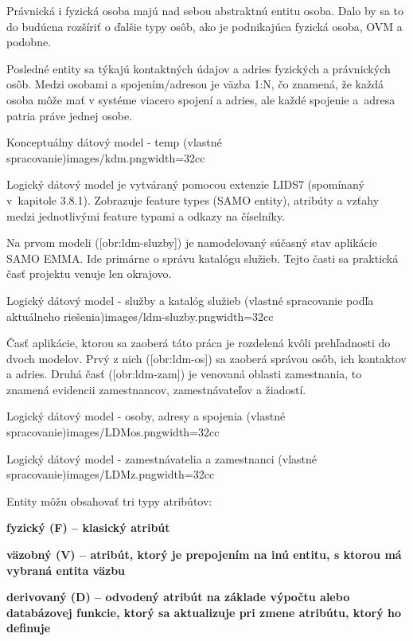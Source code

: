 Právnická i fyzická osoba majú nad sebou abstraktnú entitu osoba. Dalo by sa to do budúcna rozšíriť o ďalšie typy osôb, ako je podnikajúca fyzická osoba, OVM a podobne. 

Posledné entity sa týkajú kontaktných údajov a adries fyzických a právnických osôb. Medzi osobami a spojením/adresou je väzba 1:N, čo znamená, že každá osoba môže mať v systéme viacero spojení a adries, ale každé spojenie a~adresa patria práve jednej osobe.


{Konceptuálny dátový model - temp (vlastné spracovanie)}{images/kdm.png}{width=32cc}

\zlom
{}
Logický dátový model je vytváraný pomocou extenzie LIDS7 (spomínaný v~kapitole 3.8.1). Zobrazuje feature types (SAMO entity), atribúty a vzťahy medzi jednotlivými feature typami a odkazy na číselníky.

Na prvom modeli ([obr:ldm-sluzby]) je namodelovaný súčasný stav aplikácie SAMO EMMA. Ide primárne o správu katalógu služieb. Tejto časti sa praktická časť projektu venuje len okrajovo.

{Logický dátový model - služby a katalóg služieb (vlastné spracovanie podľa aktuálneho riešenia)}{images/ldm-sluzby.png}{width=32cc}

Časť aplikácie, ktorou sa zaoberá táto práca je rozdelená kvôli prehľadnosti do dvoch modelov. Prvý z nich ([obr:ldm-os]) sa zaoberá správou osôb, ich kontaktov a adries. Druhá časť ([obr:ldm-zam]) je venovaná oblasti zamestnania, to znamená evidencii zamestnancov, zamestnávateľov a žiadostí.

{Logický dátový model - osoby, adresy a spojenia (vlastné spracovanie)}{images/LDMos.png}{width=32cc}

{Logický dátový model - zamestnávatelia a zamestnanci (vlastné spracovanie)}{images/LDMz.png}{width=32cc}


Entity môžu obsahovať tri typy atribútov:

\startitemize
\item {\start\bf fyzický (F) \stop -- klasický atribút}
\item {\start\bf väzobný (V) \stop -- atribút, ktorý je prepojením na inú entitu, s ktorou má vybraná entita väzbu}
\item {\start\bf derivovaný (D) \stop -- odvodený atribút na základe výpočtu alebo databázovej funkcie, ktorý sa aktualizuje pri zmene atribútu, ktorý ho definuje}
\stopitemize

